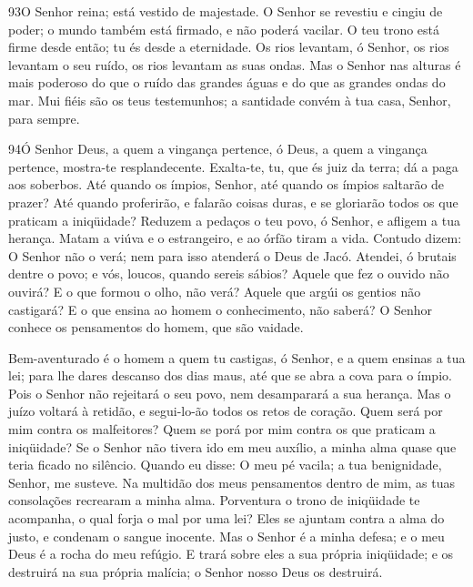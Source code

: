 \bigskip

\lettrine{93}{}O Senhor reina; está vestido de majestade. O
Senhor se revestiu e cingiu de poder; o mundo também está firmado, e
não poderá vacilar. O teu trono está firme desde então; tu és
desde a eternidade. Os rios levantam, ó Senhor, os rios levantam
o seu ruído, os rios levantam as suas ondas. Mas o Senhor nas
alturas é mais poderoso do que o ruído das grandes águas e do que as
grandes ondas do mar. Mui fiéis são os teus testemunhos; a
santidade convém à tua casa, Senhor, para sempre.

\bigskip

\lettrine{94}{}Ó Senhor Deus, a quem a vingança pertence, ó
Deus, a quem a vingança pertence, mostra-te resplandecente.
Exalta-te, tu, que és juiz da terra; dá a paga aos soberbos.
Até quando os ímpios, Senhor, até quando os ímpios saltarão de
prazer? Até quando proferirão, e falarão coisas duras, e se
gloriarão todos os que praticam a iniqüidade? Reduzem a pedaços
o teu povo, ó Senhor, e afligem a tua herança. Matam a viúva e o
estrangeiro, e ao órfão tiram a vida. Contudo dizem: O Senhor
não o verá; nem para isso atenderá o Deus de Jacó. Atendei, ó
brutais dentre o povo; e vós, loucos, quando sereis sábios?
Aquele que fez o ouvido não ouvirá? E o que formou o olho, não
verá? Aquele que argúi os gentios não castigará? E o que
ensina ao homem o conhecimento, não saberá? O Senhor conhece
os pensamentos do homem, que são vaidade.

Bem-aventurado é o homem a quem tu castigas, ó Senhor, e a quem
ensinas a tua lei; para lhe dares descanso dos dias maus, até
que se abra a cova para o ímpio. Pois o Senhor não rejeitará
o seu povo, nem desamparará a sua herança. Mas o juízo
voltará à retidão, e segui-lo-ão todos os retos de coração.
Quem será por mim contra os malfeitores? Quem se porá por mim
contra os que praticam a iniqüidade? Se o Senhor não tivera
ido em meu auxílio, a minha alma quase que teria ficado no silêncio.
Quando eu disse: O meu pé vacila; a tua benignidade, Senhor,
me susteve. Na multidão dos meus pensamentos dentro de mim,
as tuas consolações recrearam a minha alma. Porventura o
trono de iniqüidade te acompanha, o qual forja o mal por uma lei?
Eles se ajuntam contra a alma do justo, e condenam o sangue
inocente. Mas o Senhor é a minha defesa; e o meu Deus é a
rocha do meu refúgio. E trará sobre eles a sua própria
iniqüidade; e os destruirá na sua própria malícia; o Senhor nosso
Deus os destruirá.

\bigskip

